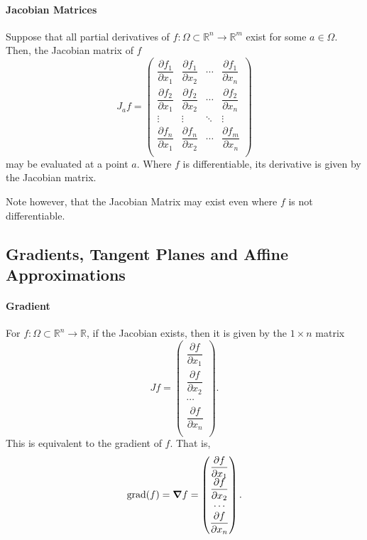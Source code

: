 \paragraph{Jacobian Matrices}
Suppose that all partial derivatives of \(f:\Omega \subset \mathbb{R}^n \to \mathbb{R}^m\)
exist for some \(a\in \Omega\). Then, the Jacobian matrix of \(f\)
\[
    J_a f = 
    \begin{pmatrix}
        \dfrac{\partial f_1}{\partial x_1} & \dfrac{\partial f_1}{\partial x_2} & \cdots & \dfrac{\partial f_1}{\partial x_n} \\
    \dfrac{\partial f_2}{\partial x_1} & \dfrac{\partial f_2}{\partial x_2} & \cdots & \dfrac{\partial f_2}{\partial x_n} \\
    \vdots & \vdots & \ddots & \vdots \\
    \dfrac{\partial f_n}{\partial x_1} & \dfrac{\partial f_n}{\partial x_2} & \cdots & \dfrac{\partial f_m}{\partial x_n} \\
    \end{pmatrix}
\]
may be evaluated at a point \(a\).
Where \(f\) is differentiable, its derivative is given by the Jacobian matrix.

Note however, that the Jacobian Matrix may exist even where \(f\) is not differentiable.

\subsection{Gradients, Tangent Planes and Affine Approximations}

\paragraph{Gradient}
For \(f: \Omega\subset \mathbb{R}^n\to \mathbb{R}\), if the Jacobian exists,
then it is given by the \(1\times n\) matrix
\[
    Jf = \begin{pmatrix}
        \dfrac{\partial f}{\partial x_1} \\
        \dfrac{\partial f}{\partial x_2} \\
        \cdots                           \\
        \dfrac{\partial f}{\partial x_n} \\
    \end{pmatrix}.
\]
This is equivalent to the gradient of \(f\). That is,
\[
    \text{grad}(f) = \grad f = 
    \begin{pmatrix}
        \dfrac{\partial f}{\partial x_1} \\
        \dfrac{\partial f}{\partial x_2} \\
        \cdots                           \\
        \dfrac{\partial f}{\partial x_n} \\
    \end{pmatrix}.
\]

